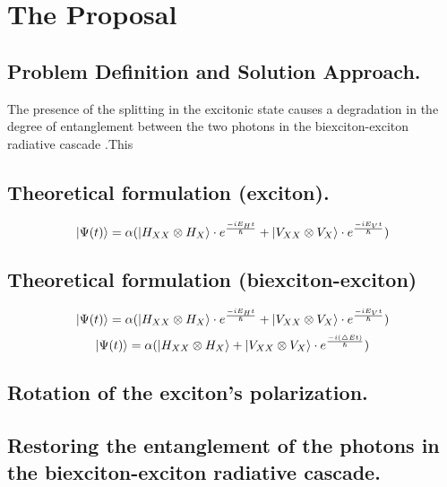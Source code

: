\section{The Proposal}
\subsection{Problem Definition and Solution Approach.}
The presence of the splitting in the excitonic state causes a degradation in the degree of entanglement between the two photons in the biexciton-exciton radiative cascade \cite{Winik2017}.This       
\subsection{Theoretical formulation (exciton).}
\begin{equation}
	\ket{\Psi(t)} = \alpha(\ket{H_{XX} \otimes  H_X}\cdot e^{\frac{-iE_H t}{\hslash}}+\ket{V_{XX}\otimes V_X}\cdot e^{\frac{-iE_Vt}{\hslash}})
\end{equation}
\subsection{Theoretical formulation (biexciton-exciton)}
	\begin{equation}
	\ket{\Psi(t)} = \alpha(\ket{H_{XX} \otimes  H_X}\cdot e^{\frac{-iE_H t}{\hslash}}+\ket{V_{XX}\otimes V_X}\cdot e^{\frac{-iE_Vt}{\hslash}})
	\end{equation}
\begin{equation}
	\ket{\Psi(t)} = \alpha(\ket{H_{XX} \otimes H_X}+\ket{V_{XX}\otimes V_X}\cdot e^{\frac{-i(\triangle Et)}{\hslash}})
\end{equation}
\subsection{Rotation of the exciton's polarization.}
\subsection{Restoring the entanglement of the photons in the biexciton-exciton radiative cascade.}

